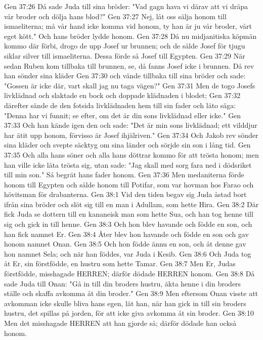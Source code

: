 Gen 37:26  Då sade Juda till sina bröder: "Vad gagn hava vi därav att vi dräpa vår broder och dölja hans blod?"
Gen 37:27  Nej, låt oss sälja honom till ismaeliterna; må vår hand icke komma vid honom, ty han är ju vår broder, vårt eget kött." Och hans bröder lydde honom.
Gen 37:28  Då nu midjanitiska köpmän kommo där förbi, drogo de upp Josef ur brunnen; och de sålde Josef för tjugu siklar silver till ismaeliterna. Dessa förde så Josef till Egypten.
Gen 37:29  När sedan Ruben kom tillbaka till brunnen, se, då fanns Josef icke i brunnen. Då rev han sönder sina kläder
Gen 37:30  och vände tillbaka till sina bröder och sade: "Gossen är icke där, vart skall jag nu taga vägen?"
Gen 37:31  Men de togo Josefs livklädnad och slaktade en bock och doppade klädnaden i blodet;
Gen 37:32  därefter sände de den fotsida livklädnaden hem till sin fader och läto säga: "Denna har vi funnit; se efter, om det är din sons livklädnad eller icke."
Gen 37:33  Och han kände igen den och sade: "Det är min sons livklädnad; ett vilddjur har ätit upp honom, förvisso är Josef ihjälriven."
Gen 37:34  Och Jakob rev sönder sina kläder och svepte säcktyg om sina länder och sörjde sin son i lång tid.
Gen 37:35  Och alla hans söner och alla hans döttrar kommo för att trösta honom; men han ville icke låta trösta sig, utan sade: "Jag skall med sorg fara ned i dödsriket till min son." Så begrät hans fader honom.
Gen 37:36  Men medaniterna förde honom till Egypten och sålde honom till Potifar, som var hovman hos Farao och hövitsman för drabanterna.
Gen 38:1  Vid den tiden begav sig Juda åstad bort ifrån sina bröder och slöt sig till en man i Adullam, som hette Hira.
Gen 38:2  Där fick Juda se dottern till en kananeisk man som hette Sua, och han tog henne till sig och gick in till henne.
Gen 38:3  Och hon blev havande och födde en son, och han fick namnet Er.
Gen 38:4  Åter blev hon havande och födde en son och gav honom namnet Onan.
Gen 38:5  Och hon födde ännu en son, och åt denne gav hon namnet Sela; och när han föddes, var Juda i Kesib.
Gen 38:6  Och Juda tog åt Er, sin förstfödde, en hustru som hette Tamar.
Gen 38:7  Men Er, Judas förstfödde, misshagade HERREN; därför dödade HERREN honom.
Gen 38:8  Då sade Juda till Onan: "Gå in till din broders hustru, äkta henne i din broders ställe och skaffa avkomma åt din broder."
Gen 38:9  Men eftersom Onan visste att avkomman icke skulle bliva hans egen, lät han, när han gick in till sin broders hustru, det spillas på jorden, för att icke giva avkomma åt sin broder.
Gen 38:10  Men det misshagade HERREN att han gjorde så; därför dödade han också honom.
